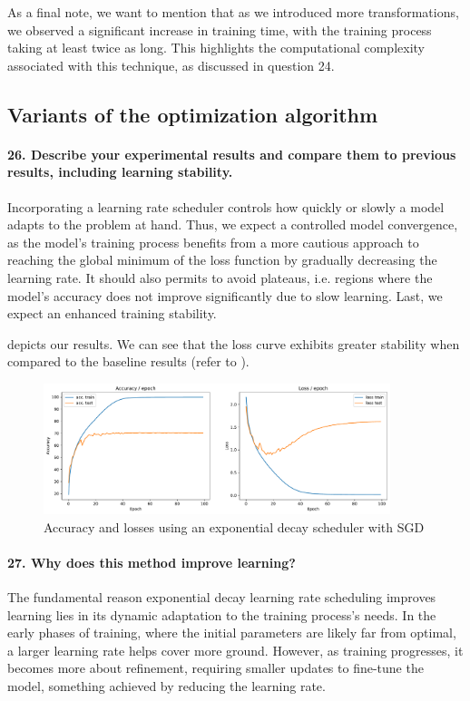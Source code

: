 As a final note, we want to mention that as we introduced more transformations, we observed a significant increase in training time, with the training process taking at least twice as long. This highlights the computational complexity associated with this technique, as discussed in question 24.

\subsection{Variants of the optimization algorithm}
\paragraph{26. Describe your experimental results and compare them to previous results, including learning stability.}

Incorporating a learning rate scheduler controls how quickly or slowly a model adapts to the problem at hand. Thus, we expect a controlled model convergence, as the model's training process benefits from a more cautious approach to reaching the global minimum of the loss function by gradually decreasing the learning rate. It should also permits to avoid plateaus, i.e. regions where the model's accuracy does not improve significantly due to slow learning. Last, we expect an enhanced training stability.

 depicts our results. We can see that the loss curve exhibits greater stability when compared to the baseline results (refer to ).

\begin{figure}[H]
    \centering
    \includegraphics*[width=0.9\textwidth]{figs/CNN/optim_variants.pdf}
    \caption{Accuracy and losses using an exponential decay scheduler with SGD}
    \label{fig:optim_variants}
\end{figure}

\paragraph{27. Why does this method improve learning?}
The fundamental reason exponential decay learning rate scheduling improves learning lies in its dynamic adaptation to the training process's needs. In the early phases of training, where the initial parameters are likely far from optimal, a larger learning rate helps cover more ground. However, as training progresses, it becomes more about refinement, requiring smaller updates to fine-tune the model, something achieved by reducing the learning rate.

